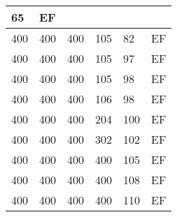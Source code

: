\begin{table}[]
\begin{tabular}{lllll|l|}
65                                 & EF                                    \\ \hline
400                                 & 400                                & 400                                & 105                                & 
82                                 & EF                                    \\ \hline
400                                 & 400                                & 400                                & 105                                & 
97                                 & EF                                    \\ \hline
400                                 & 400                                & 400                                & 105                                & 
98                                 & EF                                    \\ \hline
400                                 & 400                                & 400                                & 106                                & 
98                                 & EF                                    \\ \hline
400                                 & 400                                & 400                                & 204                                & 
100                                & EF                                    \\ \hline
400                                 & 400                                & 400                                & 302                                & 
102                                & EF                                    \\ \hline
400                                 & 400                                & 400                                & 400                                & 
105                                & EF                                    \\ \hline
400                                 & 400                                & 400                                & 400                                & 
108                                & EF                                    \\ \hline
400                                 & 400                                & 400                                & 400                                & 
110                                & EF                                    \\ \hline

\end{tabular}
\end{table}

